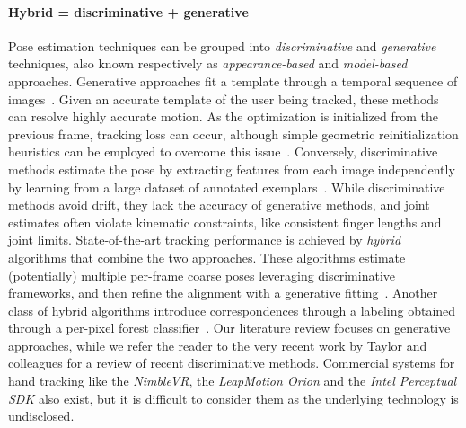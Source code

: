 \paragraph{Hybrid = discriminative + generative}
% 
Pose estimation techniques can be grouped into \emph{discriminative} and \emph{generative} techniques, also known respectively as \emph{appearance-based} and \emph{model-based} approaches.
Generative approaches fit a template through a temporal sequence of images~\cite{oiko2011hand,melax2013dynamics,schroder2014real,tagliasacchi2015robust}. Given an accurate template of the user being tracked, these methods can resolve highly accurate motion. As the optimization is initialized from the previous frame, tracking loss can occur, although simple geometric reinitialization heuristics can be employed to overcome this issue~\cite{melax2013dynamics,qian2014realtime}. 
Conversely, discriminative methods estimate the pose by extracting features from each image independently by learning from a large dataset of annotated exemplars~\cite{keskin2012hand,tang2013real,tejani2014latent,sun2015cascaded}.
While discriminative methods avoid drift, they lack the accuracy of generative methods, and joint estimates often violate kinematic constraints, like consistent finger lengths and joint limits.
State-of-the-art tracking performance is achieved by \emph{hybrid} algorithms that combine the two approaches. These algorithms estimate (potentially) multiple per-frame coarse poses leveraging discriminative frameworks, and then refine the alignment with a generative fitting~\cite{tompson2014real,qian2014realtime,sharp2015accurate}.
Another class of hybrid algorithms introduce correspondences through a labeling obtained through a per-pixel forest  classifier~\cite{sridhar2015fast,fleishman2015icpik}.
% 
Our literature review focuses on generative approaches, while we refer the reader to the very recent work by Taylor and colleagues  for a review of recent discriminative methods. Commercial systems for hand tracking like the \emph{NimbleVR}, the \emph{LeapMotion Orion} and the \emph{Intel Perceptual SDK} also exist, but it is difficult to consider them as the underlying technology is undisclosed.

